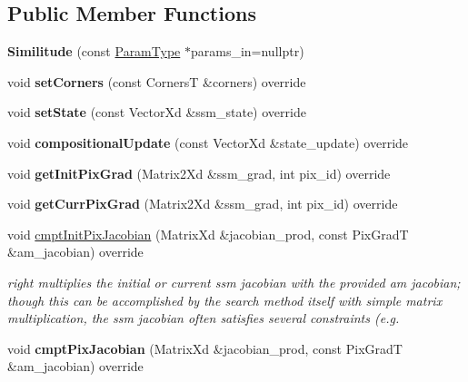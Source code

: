 \subsection*{Public Member Functions}
\begin{DoxyCompactItemize}
\item 
\hypertarget{classSimilitude_a154f86f41623770bd278875af048c7f1}{{\bfseries Similitude} (const \hyperlink{structSimilitudeParams}{Param\-Type} $\ast$params\-\_\-in=nullptr)}\label{classSimilitude_a154f86f41623770bd278875af048c7f1}

\item 
\hypertarget{classSimilitude_a4e0b0a949f94902320ff34740e044554}{void {\bfseries set\-Corners} (const Corners\-T \&corners) override}\label{classSimilitude_a4e0b0a949f94902320ff34740e044554}

\item 
\hypertarget{classSimilitude_a4a528ed67ab6afe21776c2a57ee7a6d0}{void {\bfseries set\-State} (const Vector\-Xd \&ssm\-\_\-state) override}\label{classSimilitude_a4a528ed67ab6afe21776c2a57ee7a6d0}

\item 
\hypertarget{classSimilitude_aa6af70ed9fe0ddde1659a0c02462ebd7}{void {\bfseries compositional\-Update} (const Vector\-Xd \&state\-\_\-update) override}\label{classSimilitude_aa6af70ed9fe0ddde1659a0c02462ebd7}

\item 
\hypertarget{classSimilitude_a44cc27ae18d3b7db89a0d1ab2b7f23d9}{void {\bfseries get\-Init\-Pix\-Grad} (Matrix2\-Xd \&ssm\-\_\-grad, int pix\-\_\-id) override}\label{classSimilitude_a44cc27ae18d3b7db89a0d1ab2b7f23d9}

\item 
\hypertarget{classSimilitude_aaf73363b4c2376c58dcdd5beef0ac368}{void {\bfseries get\-Curr\-Pix\-Grad} (Matrix2\-Xd \&ssm\-\_\-grad, int pix\-\_\-id) override}\label{classSimilitude_aaf73363b4c2376c58dcdd5beef0ac368}

\item 
void \hyperlink{classSimilitude_a96e413d6abded447be0230c3ad7718bd}{cmpt\-Init\-Pix\-Jacobian} (Matrix\-Xd \&jacobian\-\_\-prod, const Pix\-Grad\-T \&am\-\_\-jacobian) override
\begin{DoxyCompactList}\small\item\em right multiplies the initial or current ssm jacobian with the provided am jacobian; though this can be accomplished by the search method itself with simple matrix multiplication, the ssm jacobian often satisfies several constraints (e.\-g. \end{DoxyCompactList}\item 
\hypertarget{classSimilitude_a1790f89f31766287ed6821b0074a5245}{void {\bfseries cmpt\-Pix\-Jacobian} (Matrix\-Xd \&jacobian\-\_\-prod, const Pix\-Grad\-T \&am\-\_\-jacobian) override}\label{classSimilitude_a1790f89f31766287ed6821b0074a5245}


\end{DoxyCompactItemize}

